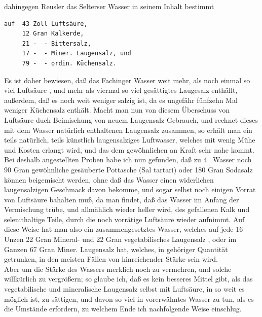 \documentclass[11pt,a5paper,twoside]{memoir}
\begin{document}
\noindent
dahingegen Reusler das Selterser Wasser in seinem Inhalt bestimmt
\begin{lstlisting}
auf  43 Zoll Luftsäure,
     12 Gran Kalkerde,
     21 -  - Bittersalz,
     17 -  - Miner. Laugensalz, und
     79 -  - ordin. Küchensalz.
\end{lstlisting}

Es ist daher bewiesen,
daß das Fachinger Wasser weit mehr,
als noch einmal so viel Luftsäure%
,
und mehr als viermal so viel gesättigtes Laugesalz enthällt,
außerdem, daß es noch weit weniger salzig ist,
da es ungefähr fünfzehn Mal weniger Küchensalz enthält.
Macht man nun von diesem Überschuss von Luftsäure
duch Beimischung von neuem Laugensalz Gebrauch,
und rechnet dieses mit dem Wasser natürlich enthaltenen Laugensalz zusammen,
so erhält man ein teils natürlich,
teils künstlich laugensalziges Luftwasser,
welches mit wenig Mühe und Kosten erlangt wird,
und das dem gewöhnlichen an Kraft sehr nahe kommt.\\

Bei deshalb angestellten Proben habe ich nun gefunden,
daß zu \mbox{4 \Pfund} Wasser
noch 90 Gran gewöhnliche gesäuberte Pottasche ({\lattext Sal tartari})
oder 180 Gran Sodasalz können beigemischt werden,
ohne daß das Wasser einen widerlichen laugensalzigen Geschmack davon bekomme,
und sogar selbst noch einigen Vorrat von Luftsäure bahalten muß,
da man findet, daß das Wasser im Anfang der Vermischung trübe,
und allmählich wieder heller wird,
des gefallenen Kalk und selenithaltige Teile,
durch die noch vorrätige Luftsäure wieder aufnimmt.
Auf diese Weise hat man also ein zusammengesetztes Wasser,
welches auf jede 16 Unzen 22 Gran Mineral-%
und 22 Gran vegetabilisches Laugensalz%
,
oder im Ganzen 67 Gran Miner. Laugensalz hat,
welches, in gehöriger Quantität getrunken,
in den meisten Fällen von hinreichender Stärke sein wird.\\

Aber um die Stärke des Wassers merklich noch zu vermehren,
und solche willkürlich zu vergrößern;
so glaube ich, daß es kein besseres Mittel gibt,
als das vegetabilische und mineralische Laugensalz selbst mit Luftsäure,
in so weit es möglich ist, zu sättigen,
und davon so viel in vorerwähntes Wasser zu tun,
als es die Umstände erfordern,
zu welchem Ende ich nachfolgende Weise einschlug.\\
\end{document}
